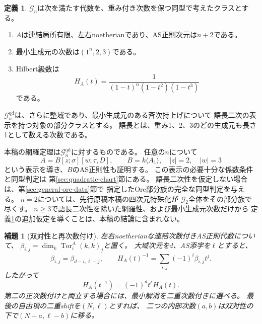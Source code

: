 \documentclass[11pt,a4paper]{ltjsarticle}
\newtheorem{lemma}[theorem]{補題}
\theoremstyle{definition}
\newtheorem{definition}[theorem]{定義}
\newcommand{\Tor}{\operatorname{Tor}}
\newcommand{\Gclass}{\mathcal G}
\begin{document}
\begin{definition}\label{def:general-class}
$\Gclass_n$は次を満たす代数を、重み付き次数を保つ同型で考えたクラスとする。
\begin{enumerate}
\item $A$は連結局所有限、左右noetherianであり、AS正則次元は$n+2$である。
\item 最小生成元の次数は$(1^n,2,3)$である。
\item Hilbert級数は
\begin{equation}\label{eq:general-target-hilbert}
H_A(t)=\frac1{(1-t)^n(1-t^2)(1-t^3)}
\end{equation}
である。
\end{enumerate}
$\Gclass_n^{\mathrm{qd}}$は、さらに整域であり、最小生成元のある斉次持上げについて
語長二次の表示を持つ対象の部分クラスとする。
語長とは、重み1、2、3のどの生成元も長さ1として数える次数である。
\end{definition}

本稿の網羅定理は$\Gclass_n^{\mathrm{qd}}$に対するものである。
任意の$n$について
\[
A=B[z;\sigma][w;\tau,D],\qquad
B=k\langle A_1\rangle,\quad |z|=2,\quad |w|=3
\]
という表示を導き、$B$のAS正則性も証明する。
この表示の必要十分な係数条件と同型判定は
第\ref{sec:quadratic-chart}節にある。
語長二次性を仮定しない場合は、第\ref{sec:general-ore-data}節で
指定したOre部分族の完全な同型判定を与える。
$n=2$については、先行原稿本稿の四次元特殊化が
$\Gclass_2$全体をその部分族で尽くす。
$n\geq3$で語長二次性を除いた網羅性、および最小生成元次数だけから
定義\ref{def:general-class}の追加仮定を導くことは、本稿の結論に含まれない。

\begin{lemma}[双対性と再次数付け]\label{lem:duality-regrading}
左右noetherianな連結次数付きAS正則代数について、
$\beta_{i,j}=\dim_k\Tor_i^A(k,k)_j$と置く。
大域次元を$d$、AS添字を$\ell$とすると、
\begin{equation}\label{eq:betti-duality}
\beta_{i,j}=\beta_{d-i,\ell-j},\qquad
H_A(t)^{-1}=\sum_{i,j}(-1)^i\beta_{i,j}t^j.
\end{equation}
したがって
\begin{equation}\label{eq:hilbert-reciprocity}
H_A(t^{-1})=(-1)^dt^\ell H_A(t).
\end{equation}
第二の正次数付けと両立する場合には、最小解消を二重次数付きに選べる。
最後の自由項の二重shiftを$(N,\ell)$とすれば、
二つの内部次数$(a,b)$は双対性の下で$(N-a,\ell-b)$に移る。
\end{lemma}
\end{document}
